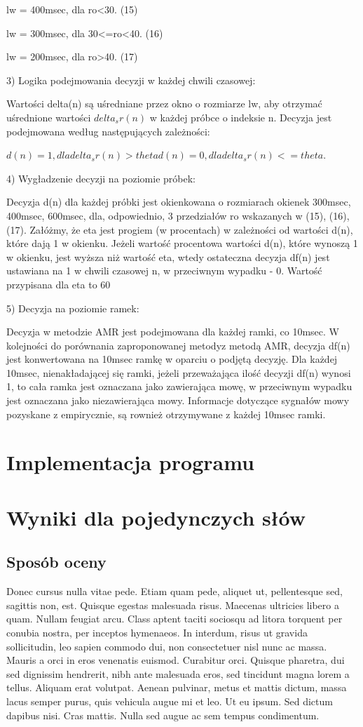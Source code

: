 \documentclass[eng,printmode]{mgr}
\begin{document}
  lw = 400msec, dla ro<30. (15)
  
  lw = 300msec, dla 30<=ro<40. (16)
  
  lw = 200msec, dla ro>40. (17)
  
  
 3) Logika podejmowania decyzji w każdej chwili czasowej:
 
 Wartości delta(n) są uśredniane przez okno o rozmiarze lw, aby otrzymać uśrednione wartości $delta_sr(n)$ w każdej próbce o indeksie n. Decyzja jest podejmowana według następujących zależności:
 
 $d(n) = 1, dla delta_sr(n)>theta
 d(n) = 0, dla delta_sr(n)<=theta.
 $
 
 4) Wygładzenie decyzji na poziomie próbek:
 
 Decyzja d(n) dla każdej próbki jest okienkowana o rozmiarach okienek 300msec, 400msec, 600msec, dla, odpowiednio, 3 przedziałów ro wskazanych w (15), (16), (17). Załóżmy, że eta jest progiem (w procentach) w zależności od wartości d(n), które dają 1 w okienku. Jeżeli wartość procentowa wartości d(n), które wynoszą 1 w okienku, jest wyższa niż wartość eta, wtedy ostateczna decyzja df(n) jest ustawiana na 1 w chwili czasowej n, w przeciwnym wypadku - 0. Wartość przypisana dla eta to 60%
 
 5) Decyzja na poziomie ramek:
 
 Decyzja w metodzie AMR jest podejmowana dla każdej ramki, co 10msec. W kolejności do porównania zaproponowanej metodyz metodą AMR, decyzja df(n) jest konwertowana na 10msec ramkę w oparciu o podjętą decyzję. Dla każdej 10msec, nienakładającej się ramki, jeżeli przeważająca ilość decyzji df(n) wynosi 1, to cała ramka jest oznaczana jako zawierająca mowę, w przeciwnym wypadku jest oznaczana jako niezawierająca mowy. Informacje dotyczące sygnałów mowy pozyskane z empirycznie, są rownież otrzymywane z każdej 10msec ramki.
  
 

\chapter{Implementacja programu}

\chapter{Wyniki dla pojedynczych słów}
 \section{Sposób oceny}
Donec cursus nulla vitae pede. Etiam quam pede, aliquet ut, pellentesque sed, sagittis non, est. Quisque egestas malesuada risus. Maecenas ultricies libero a quam. Nullam feugiat arcu. Class aptent taciti sociosqu ad litora torquent per conubia nostra, per inceptos hymenaeos. In interdum, risus ut gravida sollicitudin, leo sapien commodo dui, non consectetuer nisl nunc ac massa. Mauris a orci in eros venenatis euismod. Curabitur orci. Quisque pharetra, dui sed dignissim hendrerit, nibh ante malesuada eros, sed tincidunt magna lorem a tellus. Aliquam erat volutpat. Aenean pulvinar, metus et mattis dictum, massa lacus semper purus, quis vehicula augue mi et leo. Ut eu ipsum. Sed dictum dapibus nisi. Cras mattis. Nulla sed augue ac sem tempus condimentum. 
\end{document}
